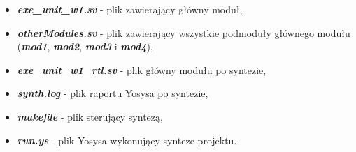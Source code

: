 \begin{itemize}
	\item \textbf{\emph{exe\_unit\_w1.sv}} - plik zawierający główny moduł,
	\item \textbf{\emph{otherModules.sv}} - plik zawierający wszystkie podmoduły głównego modułu (\textbf{\emph{mod1}}, \textbf{\emph{mod2}}, \textbf{\emph{mod3}} i \textbf{\emph{mod4}}),
	\item \textbf{\emph{exe\_unit\_w1\_rtl.sv}} - plik główny modułu po syntezie,
	\item \textbf{\emph{synth.log}} - plik raportu Yosysa po syntezie,
	\item \textbf{\emph{makefile}} - plik sterujący syntezą,
	\item \textbf{\emph{run.ys}} - plik Yosysa wykonujący synteze projektu.
\end{itemize}